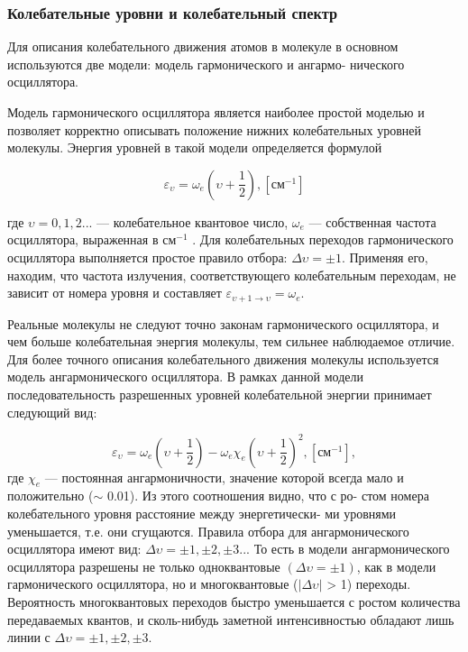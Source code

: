 \subsubsection{Колебательные уровни и колебательный спектр}

Для описания колебательного движения атомов в молекуле в основном используются две модели: модель гармонического и ангармо-
нического осциллятора.

Модель гармонического осциллятора является наиболее простой
моделью и позволяет корректно описывать положение нижних колебательных уровней молекулы. Энергия уровней в такой модели определяется формулой

\begin{equation}
\varepsilon_\upsilon = \omega_e\left(\upsilon+\frac{1}{2}\right), [\textbf{см}^{-1}]
\end{equation}

где $\upsilon = 0, 1, 2...$ — колебательное квантовое число, $\omega_e$ — собственная частота осциллятора, выраженная в см$^{-1}$ . Для колебательных переходов гармонического осциллятора выполняется простое правило отбора: $\Delta \upsilon = \pm 1$. Применяя его, находим, что частота излучения, соответствующего колебательным переходам, не зависит от номера уровня и составляет $\varepsilon_{\upsilon+1\rightarrow\upsilon} = \omega_e$.

Реальные молекулы не следуют точно законам гармонического осциллятора, и чем больше колебательная энергия молекулы, тем сильнее наблюдаемое отличие. Для более точного описания колебательного движения молекулы используется модель ангармонического осциллятора. В рамках данной модели последовательность разрешенных уровней колебательной энергии принимает следующий вид:

\begin{equation}
\varepsilon_\upsilon = \omega_e\left(\upsilon+\frac{1}{2}\right) - \omega_e\chi_e\left(\upsilon+\frac{1}{2}\right)^2, [\textbf{см}^{-1}],
\end{equation}
где $\chi_e$ — постоянная ангармоничности, значение которой всегда мало
и положительно ($\sim$ 0.01). Из этого соотношения видно, что с ро-
стом номера колебательного уровня расстояние между энергетически-
ми уровнями уменьшается, т.е. они сгущаются. Правила отбора для ангармонического осциллятора имеют вид: $\Delta \upsilon = \pm 1, \pm2, \pm3 ...$ То есть в модели ангармонического осциллятора разрешены не только одноквантовые $(\Delta\upsilon =\pm1)$, как в модели гармонического осциллятора, но и многоквантовые ($|\Delta\upsilon|$ > 1) переходы. Вероятность многоквантовых переходов быстро уменьшается с ростом количества передаваемых квантов, и сколь-нибудь заметной интенсивностью обладают лишь линии с $\Delta \upsilon = \pm 1, \pm2, \pm3$.

